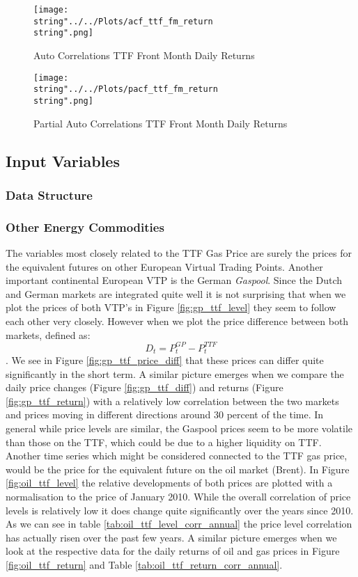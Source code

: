 \begin{figure}
  \centering
\texttt{[image: \\string"../../Plots/acf\_ttf\_fm\_return\\string".png]}
  \caption{Auto Correlations TTF Front Month Daily Returns}\label{fig:acf_ttf_fm_return}
\end{figure}

\begin{figure}
  \centering
\texttt{[image: \\string"../../Plots/pacf\_ttf\_fm\_return\\string".png]}
  \caption{Partial Auto Correlations TTF Front Month Daily Returns}\label{fig:pacf_ttf_fm_return}
\end{figure}


\subsection{Input Variables}\label{Sec:Input}

\subsubsection{Data Structure}
\subsubsection{Other Energy Commodities}
The variables most closely related to the TTF Gas Price are surely the prices for the equivalent futures on other European Virtual Trading Points. Another important continental European VTP is the German \textit{Gaspool}. Since the Dutch and German markets are integrated quite well it is not surprising that when we plot the prices of both VTP's in Figure \ref{fig:gp_ttf_level} they seem to follow each other very closely. However when we plot the price difference between both markets, defined as:
$$D_t = P^{GP}_t - P^{TTF}_t$$. We see in Figure \ref{fig:gp_ttf_price_diff} that these prices can differ quite significantly in the short term. A similar picture emerges when we compare the daily price changes (Figure \ref{fig:gp_ttf_diff}) and returns (Figure \ref{fig:gp_ttf_return}) with a relatively low correlation between the two markets and prices moving in different directions around 30 percent of the time. In general while price levels are similar, the Gaspool prices seem to be more volatile than those on the TTF, which could be due to a higher liquidity on TTF.
Another time series which might be considered connected to the TTF gas price, would be the price for the equivalent future on the oil market (Brent). In Figure \ref{fig:oil_ttf_level} the relative developments of both prices are plotted with a normalisation to the price of January 2010. While the overall correlation of price levels is relatively low it does change quite significantly over the years since 2010. As we can see in table \ref{tab:oil_ttf_level_corr_annual} the price level correlation has actually risen over the past few years. A similar picture emerges when we look at the respective data for the daily returns of oil and gas prices in Figure \ref{fig:oil_ttf_return} and Table \ref{tab:oil_ttf_return_corr_annual}.

